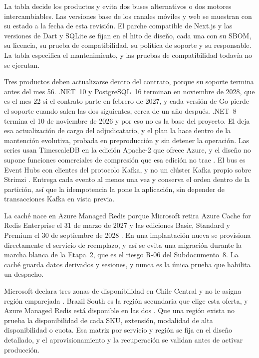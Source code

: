 La tabla decide los productos y evita dos buses alternativos o dos motores intercambiables. Las
versiones base de los canales móviles y web se muestran con su estado a la fecha de esta revisión. El
parche compatible de Next.js y las versiones de Dart y SQLite se fijan en el hito de diseño, cada una con su SBOM, su
licencia, su prueba de compatibilidad, su política de soporte y su responsable. La tabla especifica el
mantenimiento, y las pruebas de compatibilidad todavía no se ejecutan.

Tres productos deben actualizarse dentro del contrato, porque su soporte termina antes del mes 56.
.NET~10 y PostgreSQL~16 terminan en noviembre de 2028, que es el mes 22 si el contrato parte en
febrero de 2027, y cada versión de Go pierde el soporte cuando salen las dos siguientes, cerca de un año
después. .NET~8 termina el 10 de noviembre de 2026 y por eso no es la base del proyecto. El
 deja esa actualización de cargo del adjudicatario, y el plan la hace dentro de
la mantención evolutiva, probada en preproducción y sin detener la operación. Las series usan
TimescaleDB en la edición Apache-2 que ofrece Azure, y el diseño no supone funciones comerciales de
compresión que esa edición no trae \parencite{ms_pg_ext}. El bus es Event Hubs con clientes del
protocolo Kafka, y no un clúster Kafka propio sobre Strimzi \parencite{ms_eh_kafka}. Entrega cada
evento al menos una vez y conserva el orden dentro de la partición, así que la idempotencia la pone la
aplicación, sin depender de transacciones Kafka en vista previa.

La caché nace en Azure Managed Redis porque Microsoft retira Azure Cache for Redis Enterprise el 31 de
marzo de 2027 y las ediciones Basic, Standard y Premium el 30 de septiembre de 2028
\parencite{ms_redis_retiro}. En una implantación nueva se provisiona directamente el servicio de
reemplazo, y así se evita una migración durante la marcha blanca de la Etapa~2, que es el riesgo R-06
del Subdocumento~8. La caché guarda datos derivados y sesiones, y nunca es la única prueba que habilita
un despacho.

Microsoft declara tres zonas de disponibilidad en Chile Central y no le asigna región emparejada
\parencite{ms_regions}. Brazil South es la región secundaria que elige esta oferta, y Azure Managed
Redis está disponible en las dos \parencite{ms_precios_api}. Que una región exista no prueba la
disponibilidad de cada SKU, extensión, modalidad de alta disponibilidad o cuota. Esa matriz por
servicio y región se fija en el diseño detallado, y el aprovisionamiento y la recuperación se validan
antes de activar producción.

